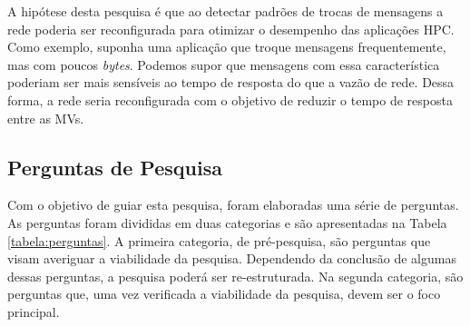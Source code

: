 \documentclass[10pt, conference, compsocconf]{IEEEtran}
\begin{document}
A hipótese desta pesquisa é que ao detectar padrões de trocas de mensagens a rede poderia ser reconfigurada para otimizar o desempenho das aplicações HPC. Como exemplo, suponha uma aplicação que troque mensagens frequentemente, mas com poucos \textit{bytes}. Podemos supor que mensagens com essa característica poderiam ser mais sensíveis ao tempo de resposta do que a vazão de rede. Dessa forma, a rede seria reconfigurada com o objetivo de reduzir o tempo de resposta entre as MVs. 

\subsection{Perguntas de Pesquisa}

Com o objetivo de guiar esta pesquisa, foram elaboradas uma série de perguntas. As perguntas foram divididas em duas categorias e são apresentadas na Tabela \ref{tabela:perguntas}. A primeira categoria, de pré-pesquisa, são perguntas que visam averiguar a viabilidade da pesquisa. Dependendo da conclusão de algumas dessas perguntas, a pesquisa poderá ser re-estruturada. Na segunda categoria, são perguntas que, uma vez verificada a viabilidade da pesquisa, devem ser o foco principal.
\end{document}
